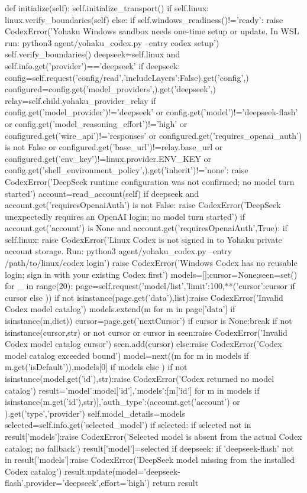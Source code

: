     def initialize(self):
        self.initialize_transport()
        if self.linux:
            linux.verify_boundaries(self)
        else:
            if self.windows_readiness()!='ready':
                raise CodexError('Yohaku Windows sandbox needs one-time setup or update. In WSL run: python3 agent/yohaku_codex.py --entry codex setup')
            self.verify_boundaries()
        deepseek=self.linux and self.info.get('provider')=='deepseek'
        if deepseek:
            config=self.request('config/read',{'includeLayers':False}).get('config',{})
            configured=config.get('model_providers',{}).get('deepseek',{})
            relay=self.child.yohaku_provider_relay
            if config.get('model_provider')!='deepseek' or config.get('model')!='deepseek-flash' or config.get('model_reasoning_effort')!='high' or configured.get('wire_api')!='responses' or configured.get('requires_openai_auth') is not False or configured.get('base_url')!=relay.base_url or configured.get('env_key')!=linux.provider.ENV_KEY or config.get('shell_environment_policy',{}).get('inherit')!='none':
                raise CodexError('DeepSeek runtime configuration was not confirmed; no model turn started')
        account=read_account(self)
        if deepseek and account.get('requiresOpenaiAuth') is not False:
            raise CodexError('DeepSeek unexpectedly requires an OpenAI login; no model turn started')
        if account.get('account') is None and account.get('requiresOpenaiAuth',True):
            if self.linux:
                raise CodexError('Linux Codex is not signed in to Yohaku private account storage. Run: python3 agent/yohaku_codex.py --entry /path/to/linux/codex login')
            raise CodexError('Windows Codex has no reusable login; sign in with your existing Codex first')
        models=[];cursor=None;seen=set()
        for _ in range(20):
            page=self.request('model/list',{'limit':100,**({'cursor':cursor} if cursor else {})})
            if not isinstance(page.get('data'),list):raise CodexError('Invalid Codex model catalog')
            models.extend(m for m in page['data'] if isinstance(m,dict))
            cursor=page.get('nextCursor')
            if cursor is None:break
            if not isinstance(cursor,str) or not cursor or cursor in seen:raise CodexError('Invalid Codex model catalog cursor')
            seen.add(cursor)
        else:raise CodexError('Codex model catalog exceeded bound')
        model=next((m for m in models if m.get('isDefault')),models[0] if models else {})
        if not isinstance(model.get('id'),str):raise CodexError('Codex returned no model catalog')
        result={'model':model['id'],'models':[m['id'] for m in models if isinstance(m.get('id'),str)],'auth_type':(account.get('account') or {}).get('type','provider')}
        self.model_details=models
        selected=self.info.get('selected_model')
        if selected:
            if selected not in result['models']:raise CodexError('Selected model is absent from the actual Codex catalog; no fallback')
            result['model']=selected
        if deepseek:
            if 'deepseek-flash' not in result['models']:raise CodexError('DeepSeek model missing from the installed Codex catalog')
            result.update(model='deepseek-flash',provider='deepseek',effort='high')
        return result

